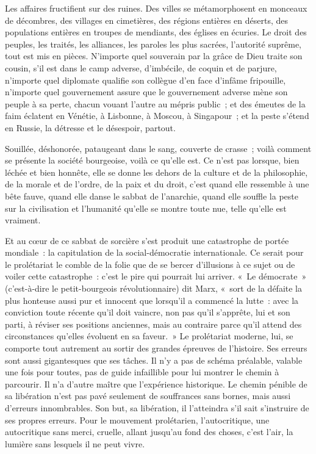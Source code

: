 \documentclass[french,twoside]{book} %
\begin{document}
Les affaires fructifient sur des ruines. Des villes se métamorphosent en monceaux de décombres, des villages en cimetières, des régions entières en déserts, des populations entières en troupes de mendiants, des églises en écuries. Le droit des peuples, les traités, les alliances, les paroles les plus sacrées, l’autorité suprême, tout est mis en pièces. N'importe quel souverain par la grâce de Dieu traite son cousin, s’il est dans le camp adverse, d’imbécile, de coquin et de parjure, n’importe quel diplomate qualifie son collègue d’en face d’infâme fripouille, n’importe quel gouvernement assure que le gouvernement adverse mène son peuple à sa perte, chacun vouant l’autre au mépris public ; et des émeutes de la faim éclatent en Vénétie, à Lisbonne, à Moscou, à Singapour ; et la peste s’étend en Russie, la détresse et le désespoir, partout.\par
Souillée, déshonorée, pataugeant dans le sang, couverte de crasse ; voilà comment se présente la société bourgeoise, voilà ce qu’elle est. Ce n’est pas lorsque, bien léchée et bien honnête, elle se donne les dehors de la culture et de la philosophie, de la morale et de l’ordre, de la paix et du droit, c’est quand elle ressemble à une bête fauve, quand elle danse le sabbat de l’anarchie, quand elle souffle la peste sur la civilisation et l’humanité qu’elle se montre toute nue, telle qu’elle est vraiment.\par
Et au cœur de ce sabbat de sorcière s’est produit une catastrophe de portée mondiale : la capitulation de la social-démocratie internationale. Ce serait pour le prolétariat le comble de la folie que de se bercer d’illusions à ce sujet ou de voiler cette catastrophe : c’est le pire qui pourrait lui arriver. « Le démocrate » (c’est-à-dire le petit-bourgeois révolutionnaire) dit Marx, « sort de la défaite la plus honteuse aussi pur et innocent que lorsqu’il a commencé la lutte : avec la conviction toute récente qu’il doit vaincre, non pas qu’il s’apprête, lui et son parti, à réviser ses positions anciennes, mais au contraire parce qu’il attend des circonstances qu’elles évoluent en sa faveur. » Le prolétariat moderne, lui, se comporte tout autrement au sortir des grandes épreuves de l’histoire. Ses erreurs sont aussi gigantesques que ses tâches.  Il n’y a pas de schéma préalable, valable une fois pour toutes, pas de guide infaillible pour lui montrer le chemin à parcourir. Il n’a d’autre maître que l’expérience historique. Le chemin pénible de sa libération n’est pas pavé seulement de souffrances sans bornes, mais aussi d’erreurs innombrables. Son but, sa libération, il l’atteindra s’il sait s’instruire de ses propres erreurs. Pour le mouvement prolétarien, l’autocritique, une autocritique sans merci, cruelle, allant jusqu’au fond des choses, c’est l’air, la lumière sans lesquels il ne peut vivre.\par
\end{document}
